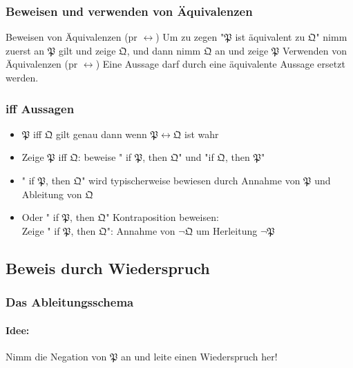         \subsubsection{Beweisen und verwenden von Äquivalenzen}
        {
            Beweisen von Äquivalenzen (pr \(\leftrightarrow\))
        }
        {
            Um zu zegen "\(\mathfrak{P}\) ist äquivalent zu \(\mathfrak{Q}\)" nimm zuerst an \(\mathfrak{P}\) gilt und zeige \(\mathfrak{Q}\), und dann nimm \(\mathfrak{Q}\) an und zeige \(\mathfrak{P}\)
        }
        {
            Verwenden von Äquivalenzen (pr \(\leftrightarrow\))
        }
        {
            Eine Aussage darf durch eine äquivalente Aussage ersetzt werden. 
        }
        \subsubsection{iff Aussagen}
        \begin{itemize}
            \item \(\mathfrak{P}\) iff \(\mathfrak{Q}\) gilt genau dann wenn \(\mathfrak{P} \leftrightarrow \mathfrak{Q}\) ist wahr
            \item Zeige \(\mathfrak{P}\) iff \(\mathfrak{Q}\): beweise " if \(\mathfrak{P}\), then \(\mathfrak{Q}\)" und "if \(\mathfrak{Q}\), then \(\mathfrak{P}\)"
            \item " if \(\mathfrak{P}\), then \(\mathfrak{Q}\)" wird typischerweise bewiesen durch Annahme von \(\mathfrak{P}\) und Ableitung von \(\mathfrak{Q}\)
            \item Oder " if \(\mathfrak{P}\), then \(\mathfrak{Q}\)" Kontraposition beweisen: \\ Zeige " if \(\mathfrak{P}\), then \(\mathfrak{Q}\)": Annahme von \(\lnot \mathfrak{Q}\) um Herleitung \(\lnot \mathfrak{P}\)
        \end{itemize}
    \subsection{Beweis durch Wiederspruch}
        \subsubsection{Das Ableitungsschema}
            \paragraph{Idee:}
                Nimm die Negation von \(\mathfrak{P}\) an und leite einen Wiederspruch her!

